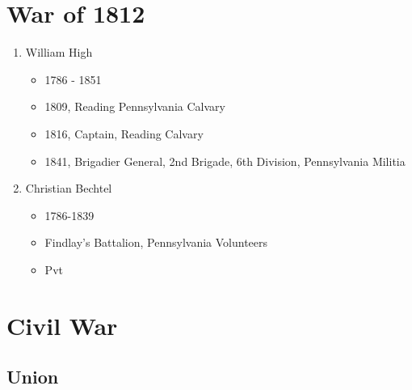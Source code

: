 \documentclass[11pt,letter]{book}
\begin{document}
\chapter{War of 1812}

\begin{enumerate}
\item William High
\begin{itemize}
\item 1786 - 1851
\item 1809, Reading Pennsylvania Calvary 
\item 1816, Captain, Reading Calvary 
\item 1841, Brigadier General, 2nd Brigade, 6th Division, Pennsylvania Militia 
\end{itemize}

\item Christian Bechtel
\begin{itemize}
\item 1786-1839
\item Findlay's Battalion, Pennsylvania Volunteers 
\item Pvt
\end{itemize}
\end{enumerate}


\chapter{Civil War}

\section{Union}
\end{document}

